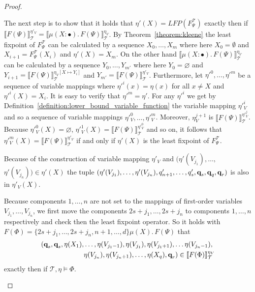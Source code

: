 \begin{proof}
\begin{compactitem}
        The next step is to show that it holds that $\eta'(X) = LFP(F^\mathcal{T}_\Psi)$ exactly then if $\llbracket F(\Psi) \rrbracket^{\eta'_V}_\mathcal{T} = \llbracket \mu (X \colon \bullet).\,F(\Psi)\rrbracket_\mathcal{T}^{\eta_V}$. 
        By Theorem~\ref{theorem:kleene} the least fixpoint of $F^\mathcal{T}_\Psi$ can be calculated by a sequence $X_0, \dots, X_m$ where here $X_0 = \emptyset$ and $X_{i+1} 
        = F_\Psi^\mathcal{T}(X_i)$ and $\eta'(X) = X_m$. On the other hand $\llbracket \mu (X \colon \bullet).\,F(\Psi)\rrbracket_\mathcal{T}^{\eta_V}$ can be calculated by a sequence 
         $Y_0, \dots, Y_{m'}$ where here $Y_0 = \varnothing$ and $Y_{i+1} = \llbracket F(\Psi)\rrbracket_\mathcal{T}^{\eta_V[X \mapsto Y_i]}$ and $Y_{m'} = \llbracket F(\Psi)\rrbracket_\mathcal{T}^{\eta'_V}$. Furthermore, let $\eta'^0, \dots, \eta'^m$ be a sequence of variable mappings where $\eta'^i(x) = \eta(x)$ for all $x \neq X$ and $\eta'^i(X) = X_i$. It is easy to verify that $\eta'^m = \eta'$. For any $\eta'^i$ we get by Definition~\ref{definition:lower_bound_variable_function} the variable mapping $\eta'^i_V$ and so a sequence of variable mappings $\eta'^0_V, \dots, \eta'^m_V$. Moreover, $\eta^{j+1}_V$ is $\llbracket F(\Psi)\rrbracket_\mathcal{T}^{\eta'^j_V}$. Because $\eta'^0_V(X) = \varnothing$, $\eta'^1_V(X) =\llbracket F(\Psi)\rrbracket_\mathcal{T}^{\eta'^0_V}$ and so on, it follows that $\eta'^m_V(X) = \llbracket F(\Psi) \rrbracket^{\eta'_V}_\mathcal{T}$ if and only if $\eta'(X)$ is the least fixpoint of $F^\mathcal{T}_\Psi$.
         
Because of the construction of variable mapping $\eta'_V$ and $(\eta'(V_{j_1}), \dots, 
        $ $\eta'(V_{j_n})) \in \eta'(X)$ the
        tuple $(\eta'(V_{j_1}), \dots, \eta'(V_{j_n}), q_{n+1}', \dots, q_s', \emph{q}_s, \emph{q}_q, \emph{q}_r)$ is also in $\eta'_V(X)$.         
        
       Because components $1, \dots, n$ are not set to the mappings of first-order variables 
       $V_{j_1}, \dots, V_{j_n}$, we first move the components $2s+j_1, \dots, 2s+j_n$ to components $1, \dots, n$ respectively and check then the least fixpoint operator.
        So it holds with $F(\Phi) = \{2s+j_1, \dots, 2s+j_n, n+1, \dots, d\} \mu (X).\, F(\Psi)$ that
        \begin{align*}
            (\emph{q}_s, \emph{q}_s, \eta(X_1),& \dots, \eta(V_{j_1-1}), \eta(V_{j_1}), \eta(V_{j_1+1}), \dots \eta(V_{j_n-1}), \\&
             \eta(V_{j_n}), \eta(V_{j_n+1}), \dots, \eta
            (X_q), \emph{q}_r) \in \llbracket  F(\Phi) \rrbracket^{\eta_V
            }_\mathcal{T}
        \end{align*}
        exactly then if $\mathcal{T}, \eta \models \Phi$.


\end{compactitem}
\end{proof}
